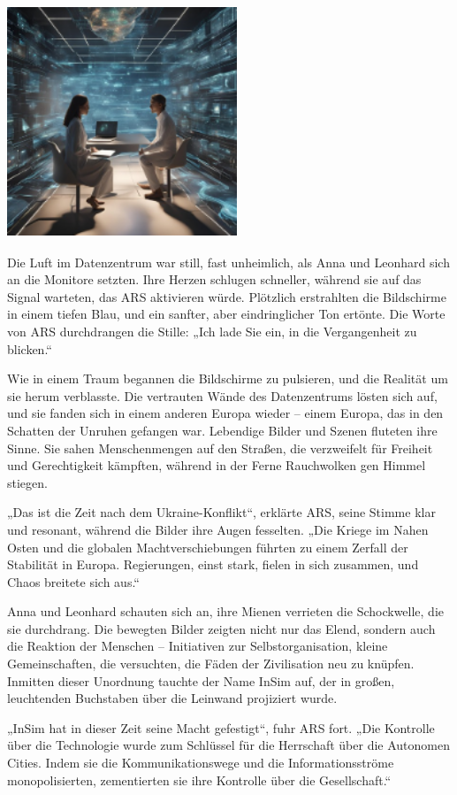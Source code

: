 \documentclass[
]{article}
\begin{document}
\includegraphics[width=2.70833in,height=2.72917in]{media/image0005.png}

Die Luft im Datenzentrum war still, fast unheimlich, als Anna und
Leonhard sich an die Monitore setzten. Ihre Herzen schlugen schneller,
während sie auf das Signal warteten, das ARS aktivieren würde. Plötzlich
erstrahlten die Bildschirme in einem tiefen Blau, und ein sanfter, aber
eindringlicher Ton ertönte. Die Worte von ARS durchdrangen die Stille:
„Ich lade Sie ein, in die Vergangenheit zu blicken.``

Wie in einem Traum begannen die Bildschirme zu pulsieren, und die
Realität um sie herum verblasste. Die vertrauten Wände des Datenzentrums
lösten sich auf, und sie fanden sich in einem anderen Europa wieder --
einem Europa, das in den Schatten der Unruhen gefangen war. Lebendige
Bilder und Szenen fluteten ihre Sinne. Sie sahen Menschenmengen auf den
Straßen, die verzweifelt für Freiheit und Gerechtigkeit kämpften,
während in der Ferne Rauchwolken gen Himmel stiegen.

„Das ist die Zeit nach dem Ukraine-Konflikt``, erklärte ARS, seine
Stimme klar und resonant, während die Bilder ihre Augen fesselten. „Die
Kriege im Nahen Osten und die globalen Machtverschiebungen führten zu
einem Zerfall der Stabilität in Europa. Regierungen, einst stark, fielen
in sich zusammen, und Chaos breitete sich aus.``

Anna und Leonhard schauten sich an, ihre Mienen verrieten die
Schockwelle, die sie durchdrang. Die bewegten Bilder zeigten nicht nur
das Elend, sondern auch die Reaktion der Menschen -- Initiativen zur
Selbstorganisation, kleine Gemeinschaften, die versuchten, die Fäden der
Zivilisation neu zu knüpfen. Inmitten dieser Unordnung tauchte der Name
InSim auf, der in großen, leuchtenden Buchstaben über die Leinwand
projiziert wurde.

„InSim hat in dieser Zeit seine Macht gefestigt``, fuhr ARS fort. „Die
Kontrolle über die Technologie wurde zum Schlüssel für die Herrschaft
über die Autonomen Cities. Indem sie die Kommunikationswege und die
Informationsströme monopolisierten, zementierten sie ihre Kontrolle über
die Gesellschaft.``
\end{document}
